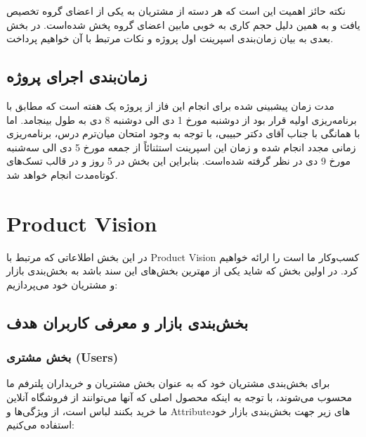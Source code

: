 \documentclass[]{article}
\begin{document}
نکته حائز اهمیت این است که هر دسته از مشتریان به یکی از اعضای گروه تخصیص
یافت و به همین دلیل حجم کاری به خوبی مابین اعضای گروه پخش شده‌است. در
بخش بعدی به بیان زمان‌بندی اسپرینت اول پروژه و نکات مرتبط با آن خواهیم
پرداخت.

\subsection{زمان‌بندی اجرای
پروژه}\label{ux632ux645ux627ux646ux628ux646ux62fux6cc-ux627ux62cux631ux627ux6cc-ux67eux631ux648ux698ux647}

مدت زمان پیشبینی شده برای انجام این فاز از پروژه یک هفته است که مطابق با
برنامه‌ریزی اولیه قرار بود از دوشنبه مورخ 1 دی الی دوشنبه 8 دی به طول
بینجامد. اما با همانگی با جناب آقای دکتر حبیبی، با توجه به وجود امتحان
میان‌ترم درس، برنامه‌ریزی زمانی مجدد انجام شده و زمان این اسپرینت
استثنائاً از جمعه مورخ 5 دی الی سه‌شنبه مورخ 9 دی در نظر گرفته شده‌است.
بنابراین این بخش در 5 روز و در قالب تسک‌های کوتاه‌مدت انجام خواهد شد.

\section{Product Vision}\label{product-vision}

در این بخش اطلاعاتی که مرتبط با Product Vision کسب‌وکار ما است را ارائه
خواهیم کرد. در اولین بخش که شاید یکی از مهترین بخش‌های این سند باشد به
بخش‌بندی بازار و مشتریان خود می‌پردازیم:

\subsection{بخش‌بندی بازار و معرفی کاربران
هدف}\label{ux628ux62eux634ux628ux646ux62fux6cc-ux628ux627ux632ux627ux631-ux648-ux645ux639ux631ux641ux6cc-ux6a9ux627ux631ux628ux631ux627ux646-ux647ux62fux641}

\subsubsection{بخش مشتری
(Users)}\label{ux628ux62eux634-ux645ux634ux62aux631ux6cc-users}

برای بخش‌بندی مشتریان خود که به عنوان بخش مشتریان و خریداران پلترفم ما
محسوب می‌شوند، با توجه به اینکه محصول اصلی که آنها می‌توانند از فروشگاه
آنلاین ما خرید بکنند لباس است، از ویژگی‌ها و Attributeهای زیر جهت
بخش‌بندی بازار خود استفاده می‌کنیم:
\end{document}
